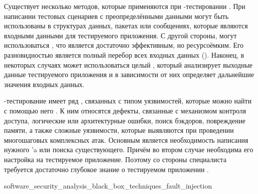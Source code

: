 %
Существует несколько  методов, которые применяются при -тестировании . 
%
При написании тестовых сценариев с преопределёнными данными могут быть использованы  в структурах данных, пакетах или сообщениях, которые являются входными данными для тестируемого приложения. 
%
С другой стороны, могут использоваться , что является достаточно эффективным, но ресурсоёмким. 
%
Его разновидностью является полный перебор всех входных данных (). 
%
Наконец, в некоторых случаях может использоваться целый , который анализирует выходные данные тестируемого приложения и в зависимости от них определяет дальнейшие значения входных данных.

%
-тестирование имеет ряд , связанных с типом уязвимостей, которые можно найти с помощью него . 
%
К ним относятся дефекты, связанные с механизмом контроля доступа, логические или архитектурные ошибки, поиск бэкдоров, повреждение памяти, а также сложные уязвимости, которые выявляются при проведении многошаговых комплексных атак. 
%
Основным  является необходимость написания нужного 'a или поиска существующего. 
%
Причём во втором случае необходима его настройка на тестируемое приложение. 
%
Поэтому со стороны специалиста требуется достаточно глубокое знание о тестируемом приложении .


	{software_security_analysis_black_box_techniques_fault_injection}

